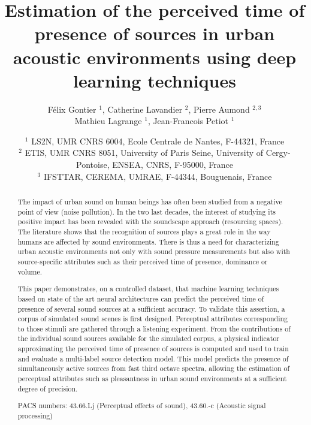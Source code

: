 \documentclass[twocolumn]{article}
\begin{document}
\author{F\'elix Gontier $^1$, Catherine Lavandier $^2$, Pierre Aumond $^{2, 3}$\\Mathieu Lagrange $^1$, Jean-Francois Petiot $^1$}
\date{
$^1$ LS2N, UMR CNRS 6004, Ecole Centrale de Nantes, F-44321, France\\
$^2$ ETIS, UMR CNRS 8051, University of Paris Seine, University of Cergy-Pontoise, ENSEA, CNRS, F-95000, France\\
$^3$ IFSTTAR, CEREMA, UMRAE, F-44344, Bouguenais, France
}
\title{Estimation of the perceived time of presence of sources in urban acoustic environments using deep learning techniques}
\maketitle


\begin{abstract}

The impact of urban sound on human beings has often been studied from a negative point of view (noise pollution). In the two last decades, the interest of studying its positive impact has been revealed with the soundscape approach (resourcing spaces). The literature shows that the recognition of sources plays a great role in the way humans are affected by sound environments. There is thus a need for characterizing urban acoustic environments not only with sound pressure measurements but also with source-specific attributes such as their perceived time of presence, dominance or volume.

This paper demonstrates, on a controlled dataset, that machine learning techniques based on state of the art neural architectures can predict the perceived time of presence of several sound sources at a sufficient accuracy. To validate this assertion, a corpus of simulated sound scenes is first designed. Perceptual attributes corresponding to those stimuli are gathered through a listening experiment. From the contributions of the individual sound sources available for the simulated corpus, a physical indicator approximating the perceived time of presence of sources is computed and used to train and evaluate a multi-label source detection model. This model predicts the presence of simultaneously active sources from fast third octave spectra, allowing the estimation of perceptual attributes such as pleasantness in urban sound environments at a sufficient degree of precision.

PACS numbers: 43.66.Lj (Perceptual effects of sound), 43.60.-c (Acoustic signal processing)
\end{abstract}
\end{document}
